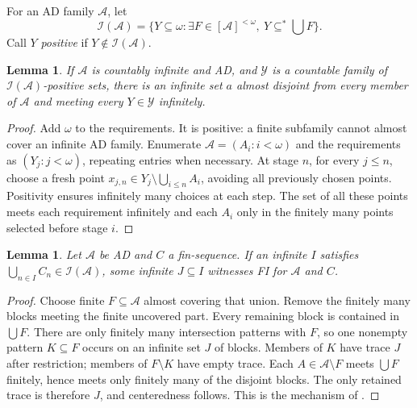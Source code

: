 \documentclass[11pt,letterpaper]{article}
\newtheorem{lemma}[theorem]{Lemma}
\theoremstyle{definition}
\theoremstyle{remark}
\newcommand{\A}{\mathcal{A}}
\newcommand{\Id}{\mathcal{I}}
\begin{document}
For an AD family $\A$, let
\[
 \Id(\A)=\{Y\subseteq\omega:\exists F\in[\A]^{<\omega},\ Y\subseteq^*\bigcup F\}.
\]
Call $Y$ \emph{positive} if $Y\notin\Id(\A)$.

\begin{lemma}\label{lem:hit}
If $\A$ is countably infinite and AD, and $\mathcal Y$ is a countable family
of $\Id(\A)$-positive sets, there is an infinite set $a$ almost disjoint
from every member of $\A$ and meeting every $Y\in\mathcal Y$ infinitely.
\end{lemma}
\begin{proof}
Add $\omega$ to the requirements. It is positive: a finite subfamily cannot
almost cover an infinite AD family. Enumerate $\A=(A_i:i<\omega)$ and the
requirements as $(Y_j:j<\omega)$, repeating entries when necessary.
At stage $n$, for every $j\leq n$, choose a fresh point
$x_{j,n}\in Y_j\setminus\bigcup_{i\leq n}A_i$, avoiding all previously
chosen points. Positivity ensures infinitely many choices at each step.
The set of all these points meets each requirement infinitely and each
$A_i$ only in the finitely many points selected before stage $i$.
\end{proof}

\begin{lemma}\label{lem:cover}
Let $\A$ be AD and $C$ a fin-sequence. If an infinite $I$ satisfies
$\bigcup_{n\in I}C_n\in\Id(\A)$, some infinite $J\subseteq I$ witnesses FI
for $\A$ and $C$.
\end{lemma}
\begin{proof}
Choose finite $F\subseteq\A$ almost covering that union. Remove the finitely
many blocks meeting the finite uncovered part. Every remaining block is
contained in $\bigcup F$. There are only finitely many intersection
patterns with $F$, so one nonempty pattern $K\subseteq F$ occurs on an
infinite set $J$ of blocks. Members of $K$ have trace $J$ after restriction;
members of $F\setminus K$ have empty trace. Each $A\in\A\setminus F$ meets
$\bigcup F$ finitely, hence meets only finitely many of the disjoint blocks.
The only retained trace is therefore $J$, and centeredness follows.
This is the mechanism of \cite[Lemma~2.4]{CR}.
\end{proof}
\end{document}
